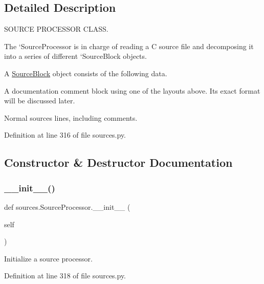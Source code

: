 \subsection{Detailed Description}
S\+O\+U\+R\+CE P\+R\+O\+C\+E\+S\+S\+OR C\+L\+A\+SS. 

The `\+Source\+Processor\textquotesingle{} is in charge of reading a C source file and decomposing it into a series of different `\+Source\+Block\textquotesingle{} objects.

A \hyperlink{classsources_1_1_source_block}{Source\+Block} object consists of the following data.


\begin{DoxyItemize}
\item A documentation comment block using one of the layouts above. Its exact format will be discussed later.
\item Normal sources lines, including comments. 
\end{DoxyItemize}

Definition at line 316 of file sources.\+py.



\subsection{Constructor \& Destructor Documentation}
\mbox{\label{classsources_1_1_source_processor_a976a915b122b4e1eaae02ff140c04292}} 
\subsubsection{\texorpdfstring{\+\_\+\+\_\+init\+\_\+\+\_\+()}{\_\_init\_\_()}}
{\footnotesize\ttfamily def sources.\+Source\+Processor.\+\_\+\+\_\+init\+\_\+\+\_\+ (\begin{DoxyParamCaption}\item[{}]{self }\end{DoxyParamCaption})}

\begin{DoxyVerb}Initialize a source processor.\end{DoxyVerb}
 

Definition at line 318 of file sources.\+py.



